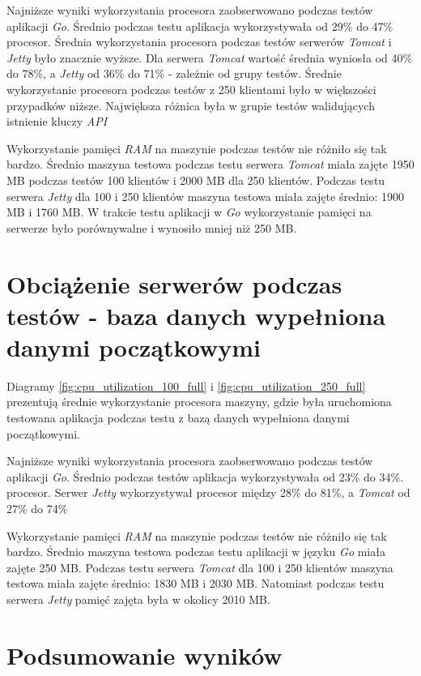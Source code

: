 Najniższe wyniki wykorzystania procesora zaobserwowano podczas testów aplikacji \textsl{Go}. Średnio podczas testu aplikacja wykorzystywała od 29\% do 47\% procesor. Średnia wykorzystania procesora podczas testów serwerów \textsl{Tomcat} i \textsl{Jetty} było znacznie wyższe. Dla serwera \textsl{Tomcat} wartość średnia wyniosła od 40\% do 78\%, a \textsl{Jetty} od 36\% do 71\% - zależnie od grupy testów. Średnie wykorzystanie procesora podczas testów z 250 klientami było w większości przypadków niższe. Największa różnica była w grupie testów walidujących istnienie kluczy \textsl{API}

Wykorzystanie pamięci \textsl{RAM} na maszynie podczas testów nie różniło się tak bardzo. Średnio maszyna testowa podczas testu serwera \textsl{Tomcat} miała zajęte 1950 MB podczas testów 100 klientów i 2000 MB dla 250 klientów. Podczas testu serwera \textsl{Jetty} dla 100 i 250 klientów maszyna testowa miała zajęte średnio: 1900 MB i 1760 MB. W trakcie testu aplikacji w \textsl{Go} wykorzystanie pamięci na serwerze było porównywalne i wynosiło mniej niż 250 MB. 



\section{Obciążenie serwerów podczas testów - baza danych wypełniona danymi początkowymi}

Diagramy \ref{fig:cpu_utilization_100_full} i \ref{fig:cpu_utilization_250_full} prezentują średnie wykorzystanie procesora maszyny, gdzie była uruchomiona testowana aplikacja podczas testu z bazą danych wypełniona danymi początkowymi. 

Najniższe wyniki wykorzystania procesora zaobserwowano podczas testów aplikacji \textsl{Go}. Średnio podczas testów aplikacja wykorzystywała od 23\% do 34\%.  procesor. Serwer \textsl{Jetty} wykorzystywał procesor między 28\% do 81\%, a \textsl{Tomcat} od 27\% do 74\%

Wykorzystanie pamięci \textsl{RAM} na maszynie podczas testów nie różniło się tak bardzo. Średnio maszyna testowa podczas testu aplikacji w języku \textsl{Go} miała zajęte 250 MB. Podczas testu serwera \textsl{Tomcat} dla 100 i 250 klientów maszyna testowa miała zajęte średnio: 1830 MB i 2030 MB. Natomiast podczas testu serwera \textsl{Jetty} pamięć zajęta była w okolicy 2010 MB. 


\clearpage

\newpage
\section{Podsumowanie wyników}
